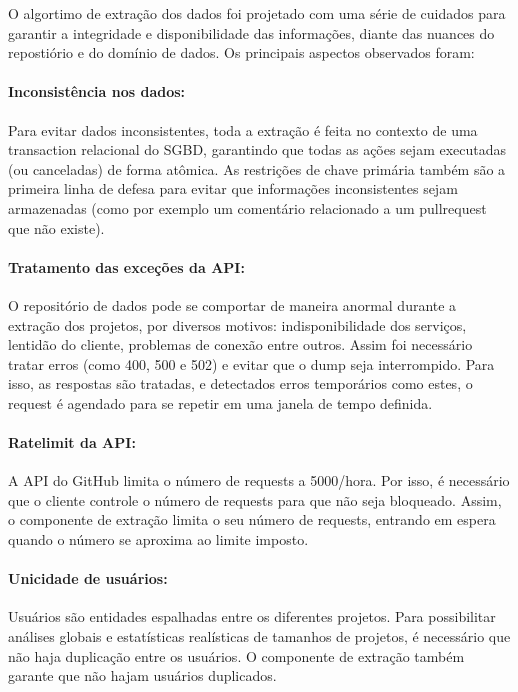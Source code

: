 \documentclass[sigconf]{acmart}
\begin{document}
O algortimo de extração dos dados foi projetado com uma série de cuidados para garantir a integridade e disponibilidade das informações, diante das nuances do repostiório e do domínio de dados. Os principais aspectos observados foram:

\paragraph{Inconsistência nos dados: } Para evitar dados inconsistentes, toda a extração é feita no contexto de uma transaction relacional do SGBD, garantindo que todas as ações sejam executadas (ou canceladas) de forma atômica. As restrições de chave primária também são a primeira linha de defesa para evitar que informações inconsistentes sejam armazenadas (como por exemplo um comentário relacionado a um pullrequest que não existe).

\paragraph{Tratamento das exceções da API: } O repositório de dados pode se comportar de maneira anormal durante a extração dos projetos, por diversos motivos: indisponibilidade dos serviços, lentidão do cliente, problemas de conexão entre outros. Assim foi necessário tratar erros (como 400, 500 e 502) e evitar que o dump seja interrompido. Para isso, as respostas são tratadas, e detectados erros temporários como estes, o request é agendado para se repetir em uma janela de tempo definida.

\paragraph{Ratelimit da API: } A API do GitHub limita o número de requests a 5000/hora. Por isso, é necessário que o cliente controle o número de requests para que não seja bloqueado. Assim, o componente de extração limita o seu número de requests, entrando em espera quando o número se aproxima ao limite imposto.

\paragraph{Unicidade de usuários: } Usuários são entidades espalhadas entre os diferentes projetos. Para possibilitar análises globais e estatísticas realísticas de tamanhos de projetos, é necessário que não haja duplicação entre os usuários. O componente de extração também garante que não hajam usuários duplicados.
\end{document}

